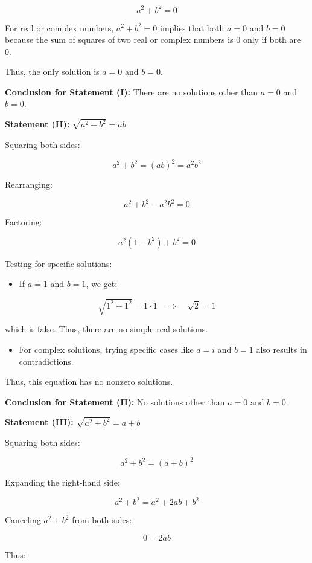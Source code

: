 \begin{enumerate}
 
 \[a^2 + b^2 = 0\]

 For real or complex numbers, $a^2 + b^2 = 0$ implies that both $a = 0$ and $b = 0$ because the sum of squares of two real or complex numbers is 0 only if both are 0.

 Thus, the only solution is $a = 0$ and $b = 0$.

 \textbf{Conclusion for Statement (I):} There are no solutions other than $a = 0$ and $b = 0$.

 \textbf{Statement (II):} $\sqrt{a^2 + b^2} = ab$

 Squaring both sides:

 
 \[a^2 + b^2 = (ab)^2 = a^2b^2\]

 Rearranging:

 
 \[a^2 + b^2 - a^2b^2 = 0\]

 Factoring:

 
 \[a^2(1 - b^2) + b^2 = 0\]

 Testing for specific solutions:

 
            \begin{itemize}
        \item If $a = 1$ and $b = 1$, we get:
            \end{itemize}
            
 \[\sqrt{1^2 + 1^2} = 1 \cdot 1 \quad \Rightarrow \quad \sqrt{2} = 1\]

 which is false. Thus, there are no simple real solutions.

 
            \begin{itemize}
        \item For complex solutions, trying specific cases like $a = i$ and $b = 1$ also results in contradictions.
            \end{itemize}
            Thus, this equation has no nonzero solutions.

 \textbf{Conclusion for Statement (II):} No solutions other than $a = 0$ and $b = 0$.

 \textbf{Statement (III):} $\sqrt{a^2 + b^2} = a + b$

 Squaring both sides:

 
 \[a^2 + b^2 = (a + b)^2\]

 Expanding the right-hand side:

 
 \[a^2 + b^2 = a^2 + 2ab + b^2\]

 Canceling $a^2 + b^2$ from both sides:

 
 \[0 = 2ab\]

 Thus:


\end{enumerate}
